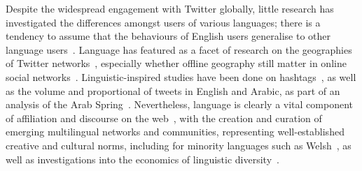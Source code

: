 \documentclass{llncs}
\begin{document}
%


Despite the widespread engagement with Twitter globally, little
research has investigated the differences amongst users of various
languages; there is a tendency to assume that the behaviours of
English users generalise to other language
users~\cite{hong-et-al:2011}. Language has featured as a facet of
research on the geographies of Twitter
networks~\cite{takhteyev-et-al:2012}, especially whether offline
geography still matter in online social
networks~\cite{kulshrestha-et-al:2012}. Linguistic-inspired studies
have been done on hashtags~\cite{cunha-et-al:2011}, as well as the
volume and proportional of tweets in English and Arabic, as part of an
analysis of the Arab Spring~\cite{bruns-et-al:2013}. Nevertheless,
language is clearly a vital component of affiliation and discourse on
the web~\cite{zappavigna+martin:2012}, with the creation and curation
of emerging multilingual networks and communities, representing
well-established creative and cultural norms, including for minority
languages such as Welsh~\cite{gj+uj:2013}, as well as investigations
into the economics of linguistic
diversity~\cite{ginsburgh+weber:2011}.
\end{document}
